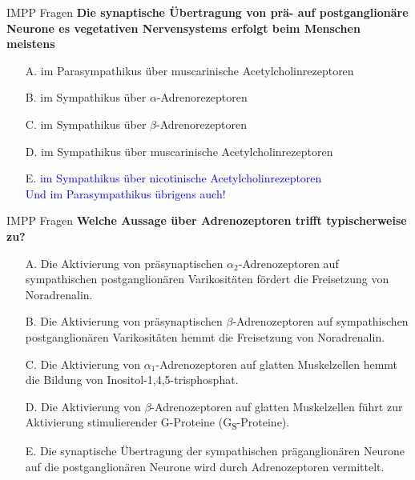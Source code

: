 \documentclass{beamer}
\begin{document}
\begin{frame}{IMPP Fragen}
\textbf{Die synaptische Übertragung von prä- auf postganglionäre Neurone es vegetativen Nervensystems erfolgt beim Menschen meistens} \\[0.2 cm]

\begin{itemize}
\item[A.] im Parasympathikus über muscarinische Acetylcholinrezeptoren
\item[B.] im Sympathikus über \(\alpha\)-Adrenorezeptoren
\item[C.] im Sympathikus über \(\beta\)-Adrenorezeptoren
\item[D.] im Sympathikus über muscarinische Acetylcholinrezeptoren
\item[E.] \textcolor{blue}{im Sympathikus über nicotinische Acetylcholinrezeptoren} \\ %
\pause
\textcolor{blue}{Und im Parasympathikus übrigens auch!}
\end{itemize}
\end{frame}



\begin{frame}{IMPP Fragen}
\textbf{Welche Aussage über Adrenozeptoren trifft typischerweise zu?} \\[0.2 cm]

\begin{itemize}
\item[A.] Die Aktivierung von präsynaptischen \(\alpha_2\)-Adrenozeptoren auf sympathischen postganglionären Varikositäten fördert die Freisetzung von Noradrenalin. 
\item[B.] Die Aktivierung von präsynaptischen \(\beta\)-Adrenozeptoren auf sympathischen  postganglionären Varikositäten hemmt die Freisetzung von Noradrenalin. 
\item[C.] Die Aktivierung von \(\alpha_1\)-Adrenozeptoren auf glatten Muskelzellen hemmt die Bildung von Inositol-1,4,5-trisphosphat.
\item[D.] Die Aktivierung von \(\beta\)-Adrenozeptoren auf glatten Muskelzellen führt zur Aktivierung stimulierender G-Proteine (G\textsubscript{S}-Proteine).
\item[E.] Die synaptische Übertragung der sympathischen präganglionären Neurone auf die postganglionären Neurone wird durch Adrenozeptoren vermittelt. 

\end{itemize}
\end{frame}
\end{document}
